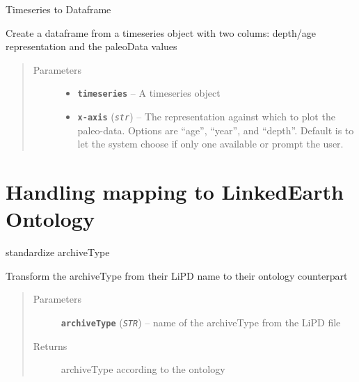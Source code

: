 \documentclass[letterpaper,10pt,english]{sphinxmanual}
\begin{document}
\begin{fulllineitems}
\label{LIPDutils:pyleoclim.TStoDF}
Timeseries to Dataframe

Create a dataframe from a timeseries object with two colums:
depth/age representation and the paleoData values
\begin{quote}\begin{description}
\item[{Parameters}] \leavevmode\begin{itemize}
\item {} 
\textbf{\texttt{timeseries}} -- A timeseries object

\item {} 
\textbf{\texttt{x-axis}} (\emph{\texttt{str}}) -- The representation against which to plot the paleo-data.
Options are ``age'', ``year'', and ``depth''. Default is to let the
system choose if only one available or prompt the user.

\end{itemize}

\end{description}\end{quote}

\end{fulllineitems}



\section{Handling mapping to LinkedEarth Ontology}
\label{LIPDutils:handling-mapping-to-linkedearth-ontology}

\begin{fulllineitems}
\label{LIPDutils:pyleoclim.LiPDtoOntology}
standardize archiveType

Transform the archiveType from their LiPD name to their ontology counterpart
\begin{quote}\begin{description}
\item[{Parameters}] \leavevmode
\textbf{\texttt{archiveType}} (\emph{\texttt{STR}}) -- name of the archiveType from the LiPD file

\item[{Returns}] \leavevmode
archiveType according to the ontology

\end{description}\end{quote}

\end{fulllineitems}
\end{document}
